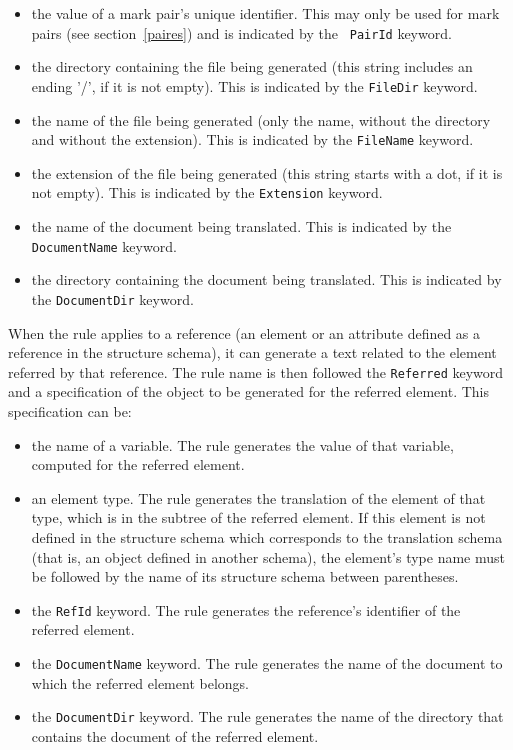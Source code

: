 \begin{itemize}
\item the value of a mark pair's unique identifier.  This may only be used
for mark pairs (see section~\ref{paires}) and is indicated by the {\tt
PairId} keyword.

\item the directory containing the file being generated (this string
includes an ending '/', if it is not empty).  This is indicated by the
{\tt FileDir} keyword.

\item the name of the file being generated (only the name, without the
directory and without the extension).  This is indicated by the {\tt FileName}
keyword.

\item the extension of the file being generated (this string starts with a
dot, if it is not empty).  This is indicated by the {\tt Extension} keyword.

\item the name of the document being translated.  This is indicated by
the {\tt DocumentName} keyword.

\item the directory containing the document being translated.  This is
indicated by the {\tt DocumentDir} keyword.

\end{itemize}

When the rule applies to a reference (an element or an attribute defined
as a reference in the structure schema), it can generate a text related
to the element referred by that reference.  The rule name is then followed
the {\tt Referred} keyword and a specification of the object to be
generated for the referred element.  This specification can be:

\begin{itemize}
\item the name of a variable.  The rule generates the value of that
variable, computed for the referred element.

\item an element type.  The rule generates the translation of the element
of that type, which is in the subtree of the referred element.  If this
element is not defined in the structure schema which corresponds to the
translation schema (that is, an object defined in another schema), the
element's type name must be followed by the name of its structure
schema between parentheses.

\item the {\tt RefId} keyword.  The rule generates the reference's
identifier of the referred element.

\item the {\tt DocumentName} keyword.  The rule generates the name of
the document to which the referred element belongs.

\item the {\tt DocumentDir} keyword.  The rule generates the name of
the directory that contains the document of the referred element.
\end{itemize}

